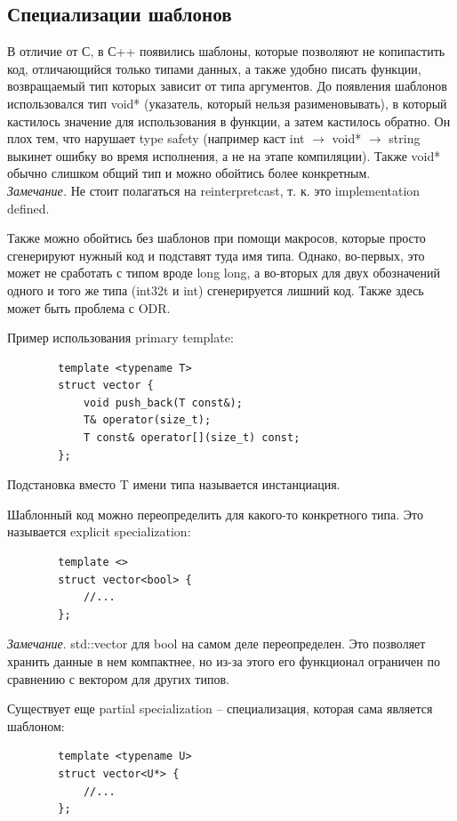 \documentclass[12pt, a4paper]{article}
\begin{document}
	\subsection{Специализации шаблонов}
	В отличие от С, в С++ появились шаблоны, которые позволяют не копипастить код, отличающийся только типами данных, а также удобно писать функции, возвращаемый тип которых зависит от типа аргументов. До появления шаблонов использовался тип void* (указатель, который нельзя разименовывать), в который кастилось значение для использования в функции, а затем кастилось обратно. Он плох тем, что нарушает type safety (например каст int $\rightarrow$ void* $\rightarrow$ string выкинет ошибку во время исполнения, а не на этапе компиляции). Также void* обычно слишком общий тип и можно обойтись более конкретным.\\
	\textit{Замечание.} Не стоит полагаться на reinterpret\textunderscore cast, т. к. это implementation defined.\par
	Также можно обойтись без шаблонов при помощи макросов, которые просто сгенерируют нужный код и подставят туда имя типа. Однако, во-первых, это может не сработать с типом вроде long long, а во-вторых для двух обозначений одного и того же типа (int32\textunderscore t и int) сгенерируется лишний код. Также здесь может быть проблема с ODR.\\\par
	Пример использования primary template:
	\begin{verbatim}
		template <typename T>
		struct vector {
			void push_back(T const&);
			T& operator(size_t);
			T const& operator[](size_t) const;
		};
	\end{verbatim}
	Подстановка вместо T имени типа называется инстанциация.\\\par 
	Шаблонный код можно переопределить для какого-то конкретного типа. Это называется explicit specialization:
	\begin{verbatim}
		template <>
		struct vector<bool> {
			//...
		};
	\end{verbatim}
	\textit{Замечание}. std::vector для bool на самом деле переопределен. Это позволяет хранить данные в нем компактнее, но из-за этого его функционал ограничен по сравнению с вектором для других типов.
	\\\par Существует еще partial specialization -- специализация, которая сама является шаблоном:
	\begin{verbatim}
		template <typename U>
		struct vector<U*> {
			//...
		};
	\end{verbatim}
\end{document}

